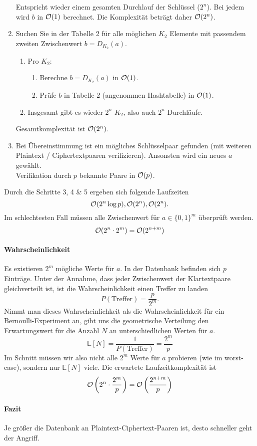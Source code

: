 \begin{enumerate}
          Entspricht wieder einem gesamten Durchlauf der Schlüssel ($2^n$). Bei jedem wird
          $b$ in $\mathcal{O}(1)$ berechnet. Die Komplexität beträgt daher $\mathcal{O}(2^n)$.
    \item Suchen Sie in der Tabelle 2 für alle möglichen $K_2$ Elemente mit
          passendem zweiten Zwischenwert $b = D_{K_2} (a)$.
          \begin{enumerate}
            \item Pro $K_2$:
            \begin{enumerate}
                \item Berechne $b = D_{K_2}(a)$ in $\mathcal{O}(1)$.
                \item Prüfe $b$ in Tabelle 2 (angenommen Hashtabelle) in $\mathcal{O}(1)$.
            \end{enumerate}
            \item Insgesamt gibt es wieder $2^n$ $K_2$, also auch $2^n$ Durchläufe.
          \end{enumerate}
          Gesamtkomplexität ist $\mathcal{O}(2^n)$.
    \item Bei Übereinstimmung ist ein mögliches Schlüsselpaar gefunden
          (mit weiteren Plaintext / Ciphertextpaaren verifizieren). Ansonsten
          wird ein neues $a$ gewählt.\vspace*{1em}\\
          Verifikation durch $p$ bekannte Paare in $\mathcal{O}(p)$.
\end{enumerate}
Durch die Schritte 3, 4 \& 5 ergeben sich folgende Laufzeiten
\[
    \mathcal{O}(2^n\log p), \mathcal{O}(2^n), \mathcal{O}(2^n).
\]
Im schlechtesten Fall müssen alle Zwischenwert für $a\in\{0,1\}^m$ überprüft werden.
\[
    \mathcal{O}(2^n\cdot 2^m) = \mathcal{O}(2^{n + m})
\]
\paragraph{Wahrscheinlichkeit} Es existieren $2^m$ mögliche Werte für $a$. In 
der Datenbank befinden sich $p$ Einträge. Unter der Annahme, dass jeder
Zwischenwert der Klartextpaare gleichverteilt ist, ist die Wahrscheinlichkeit einen
Treffer zu landen 
\[
    P(\text{Treffer})=\frac{p}{2^m}.
\]
Nimmt man dieses Wahrscheinlichkeit als die Wahrscheinlichkeit für ein Bernoulli-Experiment an,
gibt uns die geometrische Verteilung den Erwartungswert für die Anzahl $N$ an unterschiedlichen
Werten für $a$.
\[
    \mathbb{E}[N] = \frac{1}{P(\text{Treffer})} = \frac{2^m}{p}
\]
Im Schnitt müssen wir also nicht alle $2^m$ Werte für $a$ probieren (wie im worst-case),
sondern nur $\mathbb{E}[N]$ viele. Die erwartete Laufzeitkomplexität ist
\[
    \mathcal{O}\left(2^n\cdot \frac{2^m}{p}\right) = \mathcal{O}\left(\frac{2^{n + m}}{p}\right) 
\]
\paragraph{Fazit}
Je größer die Datenbank an Plaintext-Ciphertext-Paaren ist, desto schneller geht der Angriff.
